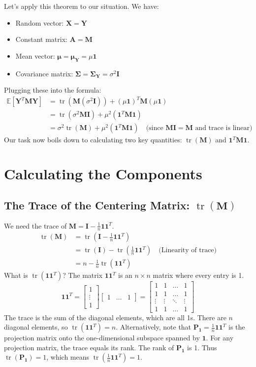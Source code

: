 \documentclass[11pt]{article}
\newcommand{\E}{\mathbb{E}} %
\newcommand{\tr}{\operatorname{tr}} %
\newcommand{\bY}{\bm{Y}} %
\newcommand{\bM}{\mathbf{M}} %
\newcommand{\bI}{\mathbf{I}} %
\newcommand{\bSigma}{\boldsymbol{\Sigma}} %
\newcommand{\bmu}{\boldsymbol{\mu}} %
\newcommand{\bone}{\mathbf{1}} %
\begin{document}
Let's apply this theorem to our situation. We have:
\begin{itemize}
    \item Random vector: $\mathbf{X} = \bY$
    \item Constant matrix: $\mathbf{A} = \bM$
    \item Mean vector: $\bmu = \bmu_{\bY} = \mu\bone$
    \item Covariance matrix: $\bSigma = \bSigma_{\bY} = \sigma^2\bI$
\end{itemize}
Plugging these into the formula:
\begin{align*}
\E[\bY^T \bM \bY] &= \tr(\bM (\sigma^2\bI)) + (\mu\bone)^T \bM (\mu\bone) \\
&= \tr(\sigma^2 \bM \bI) + \mu^2 (\bone^T \bM \bone) \\
&= \sigma^2 \tr(\bM) + \mu^2 (\bone^T \bM \bone) \quad \text{(since } \bM\bI = \bM \text{ and trace is linear)}
\end{align*}
Our task now boils down to calculating two key quantities: $\tr(\bM)$ and $\bone^T \bM \bone$.

\section{Calculating the Components}

\subsection{The Trace of the Centering Matrix: \texorpdfstring{$\tr(\bM)$}{tr(M)}}

We need the trace of $\bM = \bI - \frac{1}{n}\bone\bone^T$.
\begin{align*}
\tr(\bM) &= \tr\left(\bI - \frac{1}{n}\bone\bone^T\right) \\
&= \tr(\bI) - \tr\left(\frac{1}{n}\bone\bone^T\right) \quad \text{(Linearity of trace)} \\
&= n - \frac{1}{n} \tr(\bone\bone^T)
\end{align*}
What is $\tr(\bone\bone^T)$? The matrix $\bone\bone^T$ is an $n \times n$ matrix where every entry is 1.
\[ \bone\bone^T = \begin{bmatrix} 1 \\ \vdots \\ 1 \end{bmatrix} \begin{bmatrix} 1 & \dots & 1 \end{bmatrix} = \begin{bmatrix} 1 & 1 & \dots & 1 \\ 1 & 1 & \dots & 1 \\ \vdots & \vdots & \ddots & \vdots \\ 1 & 1 & \dots & 1 \end{bmatrix} \]
The trace is the sum of the diagonal elements, which are all 1s. There are $n$ diagonal elements, so $\tr(\bone\bone^T) = n$.
Alternatively, note that $\mathbf{P}_{\bone} = \frac{1}{n}\bone\bone^T$ is the projection matrix onto the one-dimensional subspace spanned by $\bone$. For any projection matrix, the trace equals its rank. The rank of $\mathbf{P}_{\bone}$ is 1. Thus $\tr(\mathbf{P}_{\bone}) = 1$, which means $\tr(\frac{1}{n}\bone\bone^T) = 1$.
\end{document}
